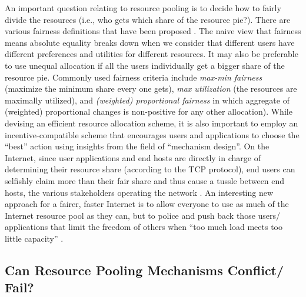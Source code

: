 \documentclass{sigcomm-alternate}
\begin{document}
An important question relating to resource pooling is to decide how to fairly divide the resources (i.e., who gets which share of the resource pie?). There are various fairness definitions that have been proposed \cite{lan2010axiomatic}. The naive view that fairness means absolute equality breaks down when we consider that different users have different preferences and utilities for different resources. It may also be preferable to use unequal allocation if all the users individually get a bigger share of the resource pie.  Commonly used fairness criteria include \textit{max-min fairness} (maximize the minimum share every one gets), \textit{max utilization} (the resources are maximally utilized), and \textit{(weighted) proportional fairness} in which aggregate of (weighted) proportional changes is non-positive for any other allocation). While devising an efficient resource allocation scheme, it is also important to employ an incentive-compatible scheme that encourages users and applications to choose the ``best'' action using insights from the field of ``mechanism design''. On the Internet, since user applications and end hosts are directly in charge of determining their resource share (according to the TCP protocol), end users can selfishly claim more than their fair share and thus cause a tussle between end hosts, the various stakeholders operating the network \cite{clark2002tussle}. An interesting new approach for a fairer, faster Internet \cite{briscoe2008fairer} is to allow everyone to use as much of the Internet resource pool as they can, but to police and push back those users/ applications that limit the freedom of others when ``too much load meets too little capacity''  \cite{jacquet2008policing}.



\subsection{Can Resource Pooling Mechanisms Conflict/ Fail?}
\end{document}

